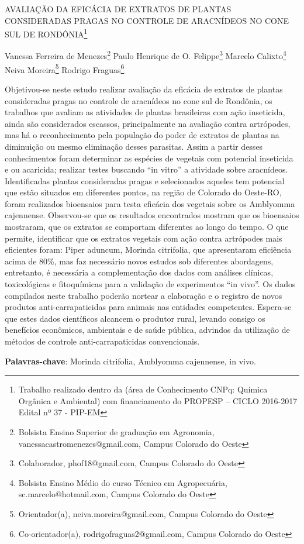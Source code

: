 \documentclass[article,12pt,onesidea,4paper,english,brazil]{abntex2}
\begin{document}
	
	
	\frenchspacing 
	
	\begin{center}
		\LARGE AVALIAÇÃO DA EFICÁCIA DE EXTRATOS DE PLANTAS CONSIDERADAS
		PRAGAS NO CONTROLE DE ARACNÍDEOS NO CONE SUL DE RONDÔNIA\footnote{Trabalho realizado dentro da (área de Conhecimento CNPq: Química Orgânica e Ambiental) com
			financiamento do PROPESP – CICLO 2016-2017 Edital nº 37 - PIP-EM}
		
		\normalsize
		Vanessa Ferreira de Menezes\footnote{Bolsista Ensino Superior de graduação em Agronomia, vanessacastromenezes@gmail.com, Campus Colorado do Oeste} 
		Paulo Henrique de O. Felippe\footnote{Colaborador, phof18@gmail.com, Campus Colorado do Oeste} 
		Marcelo	Calixto\footnote{Bolsista Ensino Médio do curso Técnico em Agropecuária, sc.marcelo@hotmail.com, Campus Colorado do Oeste} \\
		Neiva Moreira\footnote{Orientador(a), neiva.moreira@gmail.com, Campus Colorado do Oeste} 
		Rodrigo Fraguas\footnote{Co-orientador(a), rodrigofraguas2@gmail.com, Campus Colorado do Oeste} 
	\end{center}
	
	\noindent Objetivou-se neste estudo realizar avaliação da eficácia de extratos de
	plantas consideradas pragas no controle de aracnídeos no cone sul de Rondônia, os
	trabalhos que avaliam as atividades de plantas brasileiras com ação inseticida, ainda
	são considerados escassos, principalmente na avaliação contra artrópodes, mas há
	o reconhecimento pela população do poder de extratos de plantas na diminuição ou
	mesmo eliminação desses parasitas. Assim a partir desses conhecimentos foram
	determinar as espécies de vegetais com potencial inseticida e ou acaricida; realizar
	testes buscando “in vitro” a atividade sobre aracnídeos. Identificadas plantas
	consideradas pragas e selecionados aqueles tem potencial que estão situados em
	diferentes pontos, na região de Colorado do Oeste-RO, foram realizados bioensaios
	para testa eficácia dos vegetais sobre os Amblyomma cajennense. Observou-se que
	os resultados encontrados mostram que os bioensaios mostraram, que os extratos
	se comportam diferentes ao longo do tempo. O que permite, identificar que os
	extratos vegetais com ação contra artrópodes mais eficientes foram: Piper aduncum,
	Morinda citrifolia, que apresentaram eficiência acima de 80\%, mas faz necessário
	novos estudos sob diferentes abordagens, entretanto, é necessária a
	complementação dos dados com análises clínicas, toxicológicas e fitoquímicas para
	a validação de experimentos “in vivo”. Os dados compilados neste trabalho poderão
	nortear a elaboração e o registro de novos produtos anti-carrapaticidas para animais
	nas entidades competentes. Espera-se que estes dados científicos alcancem o
	produtor rural, levando consigo os benefícios econômicos, ambientais e de saúde
	pública, advindos da utilização de métodos de controle anti-carrapaticidas
	convencionais.
	
	\vspace{\onelineskip}
	
	\noindent
	\textbf{Palavras-chave}: Morinda citrifolia, Amblyomma cajennense, in vivo.
	
\end{document}
